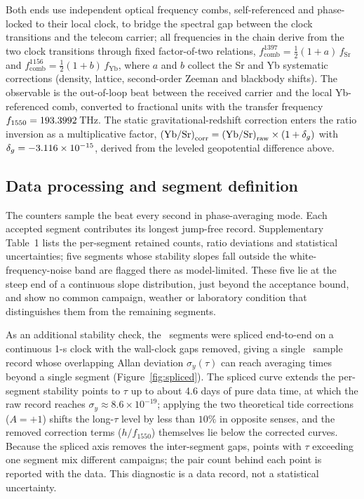 Both ends use independent optical frequency combs, self-referenced
and phase-locked to their local clock, to bridge the spectral gap
between the clock transitions and the telecom carrier; all frequencies
in the chain derive from the two clock transitions through fixed
factor-of-two relations, $f_{\mathrm{comb}}^{1397} =
\tfrac{1}{2}(1+a)\,f_{\mathrm{Sr}}$ and $f_{\mathrm{comb}}^{1156} =
\tfrac{1}{2}(1+b)\,f_{\mathrm{Yb}}$, where $a$ and $b$ collect the Sr
and Yb systematic corrections (density, lattice, second-order Zeeman
and blackbody shifts). The observable is the
out-of-loop beat between the received carrier and the local
Yb-referenced comb, converted to fractional units with the transfer
frequency $f_{1550} = 193.3992$\,THz. The static
gravitational-redshift correction enters the ratio inversion as a
multiplicative factor,
$\left(\mathrm{Yb/Sr}\right)_{\rm corr}
= \left(\mathrm{Yb/Sr}\right)_{\rm raw} \times (1+\delta_g)$ with
$\delta_g = -3.116\times10^{-15}$, derived from the leveled geopotential
difference above.

\subsection*{Data processing and segment definition}

The counters sample the beat every second in phase-averaging mode.
Each accepted segment contributes its longest jump-free record.
Supplementary Table~1 lists the per-segment retained counts, ratio
deviations and statistical uncertainties; five segments whose
stability slopes fall outside the white-frequency-noise band are
flagged there as model-limited. These five lie at the steep end of a
continuous slope distribution, just beyond the acceptance bound, and
show no common campaign, weather or laboratory condition that
distinguishes them from the remaining segments.

As an additional stability check, the \nSeg~segments were spliced
end-to-end on a continuous 1-s clock with the wall-clock gaps
removed, giving a single \nSamples~sample record whose overlapping
Allan deviation $\sigma_y(\tau)$ can reach averaging times beyond a
single segment (Figure~\ref{fig:spliced}). The spliced curve extends
the per-segment stability points to $\tau$ up to about 4.6 days of
pure data time, at which the raw record reaches
$\sigma_y \approx 8.6\times10^{-19}$; applying the two theoretical
tide corrections ($A = +1$) shifts the long-$\tau$ level by less than
$10\%$ in opposite senses, and the removed correction terms
($h/f_{1550}$) themselves lie below the corrected curves. Because the
spliced axis removes the inter-segment gaps, points with $\tau$
exceeding one segment mix different campaigns; the pair count behind
each point is reported with the data. This diagnostic is a data
record, not a statistical uncertainty.

